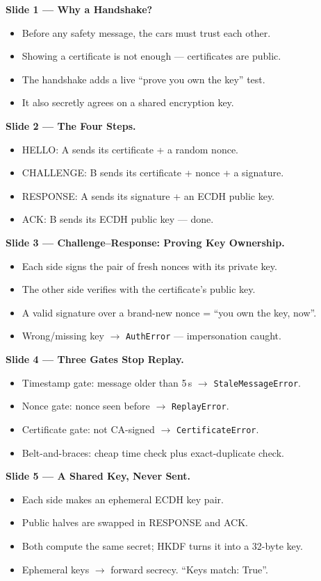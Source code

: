 \documentclass[11pt,a4paper]{report}
\begin{document}
\textbf{Slide 1 --- Why a Handshake?}
\begin{itemize}
  \item Before any safety message, the cars must trust each other.
  \item Showing a certificate is not enough --- certificates are public.
  \item The handshake adds a live ``prove you own the key'' test.
  \item It also secretly agrees on a shared encryption key.
\end{itemize}

\textbf{Slide 2 --- The Four Steps.}
\begin{itemize}
  \item HELLO: A sends its certificate + a random nonce.
  \item CHALLENGE: B sends its certificate + nonce + a signature.
  \item RESPONSE: A sends its signature + an ECDH public key.
  \item ACK: B sends its ECDH public key --- done.
\end{itemize}

\textbf{Slide 3 --- Challenge--Response: Proving Key Ownership.}
\begin{itemize}
  \item Each side signs the pair of fresh nonces with its private key.
  \item The other side verifies with the certificate's public key.
  \item A valid signature over a brand-new nonce = ``you own the key, now''.
  \item Wrong/missing key $\to$ \texttt{AuthError} --- impersonation caught.
\end{itemize}

\textbf{Slide 4 --- Three Gates Stop Replay.}
\begin{itemize}
  \item Timestamp gate: message older than 5\,s $\to$ \texttt{StaleMessageError}.
  \item Nonce gate: nonce seen before $\to$ \texttt{ReplayError}.
  \item Certificate gate: not CA-signed $\to$ \texttt{CertificateError}.
  \item Belt-and-braces: cheap time check plus exact-duplicate check.
\end{itemize}

\textbf{Slide 5 --- A Shared Key, Never Sent.}
\begin{itemize}
  \item Each side makes an ephemeral ECDH key pair.
  \item Public halves are swapped in RESPONSE and ACK.
  \item Both compute the same secret; HKDF turns it into a 32-byte key.
  \item Ephemeral keys $\to$ forward secrecy. ``Keys match: True''.
\end{itemize}
\end{document}
